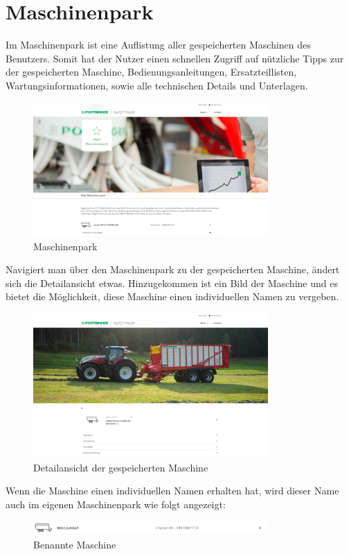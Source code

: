 \section{Maschinenpark}
Im Maschinenpark ist eine Auflistung aller gespeicherten Maschinen des Benutzers. Somit hat der Nutzer einen schnellen Zugriff auf nützliche Tipps zur der gespeicherten Maschine, Bedienungsanleitungen, Ersatzteillisten, Wartungsinformationen, sowie alle technischen Details und Unterlagen.
\begin{figure}[H]
	\centerline{
		\includegraphics[width=0.8\textwidth]{./grafiken/erm_maschinenpark.png}
	}
	\vskip0pt
	\caption{Maschinenpark} \label{fig:maschinenpark}
\end{figure}
Navigiert man über den Maschinenpark zu der gespeicherten Maschine, ändert sich die Detailansicht etwas. Hinzugekommen ist ein Bild der Maschine und es bietet die Möglichkeit, diese Maschine einen individuellen Namen zu vergeben.
\begin{figure}[H]
	\centerline{
		\includegraphics[width=0.8\textwidth]{./grafiken/erm_detailansicht_saved_machine.png}
	}
	\vskip0pt
	\caption{Detailansicht der gespeicherten Maschine} \label{fig:maschinenpark}
\end{figure}
Wenn die Maschine einen individuellen Namen erhalten hat, wird dieser Name auch im eigenen Maschinenpark wie folgt angezeigt:
\begin{figure}[H]
	\centerline{
		\includegraphics[width=0.8\textwidth]{./grafiken/erm_maschinenpark_benannteMaschine.png}
	}
	\vskip0pt
	\caption{Benannte Maschine} \label{fig:benannteMaschine}
\end{figure}